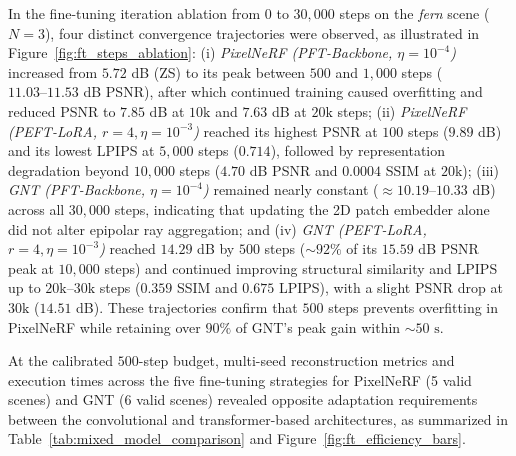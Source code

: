 In the fine-tuning iteration ablation from $0$ to $30,000$ steps on the \textit{fern} scene ($N=3$), four distinct convergence trajectories were observed, as illustrated in Figure~\ref{fig:ft_steps_ablation}: (i) \textit{PixelNeRF (PFT-Backbone, $\eta=10^{-4}$)} increased from $5.72$ dB (ZS) to its peak between $500$ and $1,000$ steps ($11.03\text{--}11.53$ dB PSNR), after which continued training caused overfitting and reduced PSNR to $7.85$ dB at $10\text{k}$ and $7.63$ dB at $20\text{k}$ steps; (ii) \textit{PixelNeRF (PEFT-LoRA, $r=4, \eta=10^{-3}$)} reached its highest PSNR at $100$ steps ($9.89$ dB) and its lowest LPIPS at $5,000$ steps ($0.714$), followed by representation degradation beyond $10,000$ steps ($4.70$ dB PSNR and $0.0004$ SSIM at $20\text{k}$); (iii) \textit{GNT (PFT-Backbone, $\eta=10^{-4}$)} remained nearly constant ($\approx 10.19\text{--}10.33$ dB) across all $30,000$ steps, indicating that updating the 2D patch embedder alone did not alter epipolar ray aggregation; and (iv) \textit{GNT (PEFT-LoRA, $r=4, \eta=10^{-3}$)} reached $14.29$ dB by $500$ steps ($\sim 92\%$ of its $15.59$ dB PSNR peak at $10,000$ steps) and continued improving structural similarity and LPIPS up to $20\text{k}\text{--}30\text{k}$ steps ($0.359$ SSIM and $0.675$ LPIPS), with a slight PSNR drop at $30\text{k}$ ($14.51$ dB). These trajectories confirm that $500$ steps prevents overfitting in PixelNeRF while retaining over $90\%$ of GNT's peak gain within $\sim 50\text{ s}$.

At the calibrated $500$-step budget, multi-seed reconstruction metrics and execution times across the five fine-tuning strategies for PixelNeRF (5 valid scenes) and GNT (6 valid scenes) revealed opposite adaptation requirements between the convolutional and transformer-based architectures, as summarized in Table~\ref{tab:mixed_model_comparison} and Figure~\ref{fig:ft_efficiency_bars}.

